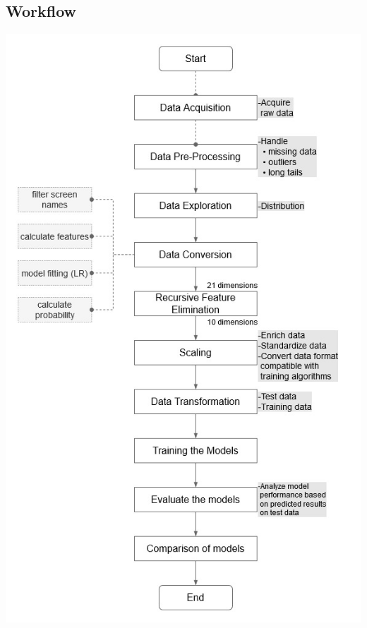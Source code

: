 \documentclass[a4paper, 12pt]{article}
\begin{document}
\subsection{Workflow}
\hfil
\includegraphics[scale = 0.6]{workflow}
\end{document}
